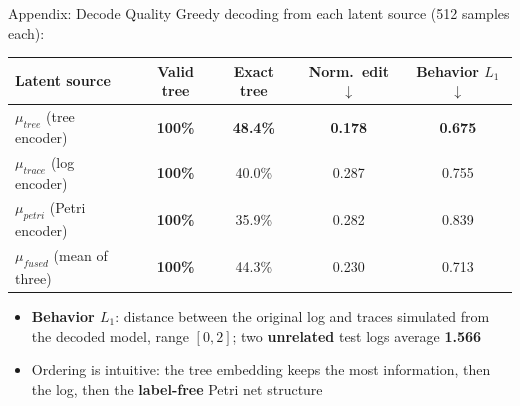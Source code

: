 \documentclass[aspectratio=169]{beamer}
\newcommand{\keyc}[1]{\textbf{\textcolor{procblue}{#1}}}
\newcommand{\keyg}[1]{\textbf{\textcolor{procgreen!70!black}{#1}}}
\newcommand{\keya}[1]{\textbf{\textcolor{procamber!85!black}{#1}}}
\begin{document}
\begin{frame}{Appendix: Decode Quality}
  Greedy decoding from each latent source (512 samples each):
  \vspace{2mm}
  \begin{center}
  \small
  \begin{tabular}{lcccc}
    \toprule
    Latent source & Valid tree & Exact tree & Norm.\ edit $\downarrow$ & Behavior $L_1$ $\downarrow$ \\
    \midrule
    $\mu_{\mathit{tree}}$ (tree encoder)   & \keyg{100\%} & \keyc{48.4\%} & \keyc{0.178} & \keyc{0.675} \\
    $\mu_{\mathit{trace}}$ (log encoder)   & \keyg{100\%} & 40.0\% & 0.287 & 0.755 \\
    $\mu_{\mathit{petri}}$ (Petri encoder) & \keyg{100\%} & 35.9\% & 0.282 & 0.839 \\
    $\mu_{\mathit{fused}}$ (mean of three) & \keyg{100\%} & 44.3\% & 0.230 & 0.713 \\
    \bottomrule
  \end{tabular}
  \end{center}
  \vspace{3mm}
  \begin{itemize}\setlength{\itemsep}{5pt}
    \item \keyc{Behavior $L_1$}: distance between the original log and traces
      simulated from the decoded model, range $[0,2]$;
      two \keya{unrelated} test logs average \keya{1.566}
    \item Ordering is intuitive: the tree embedding keeps the most information,
      then the log, then the \keya{label-free} Petri net structure
  \end{itemize}
\end{frame}
\end{document}
